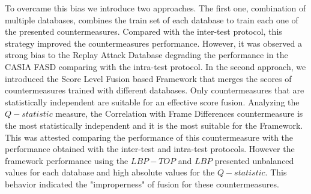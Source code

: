 To overcame this bias we introduce two approaches. The first one, combination of multiple databases, combines the train set of each database to train each one of the presented countermeasures. Compared with the inter-test protocol, this strategy improved the countermeasures performance. However, it was observed a strong bias to the Replay Attack Database degrading the performance in the CASIA FASD comparing with the intra-test protocol. In the second approach, we introduced the Score Level Fusion based Framework that merges the scores of countermeasures trained with different databases. Only countermeasures that are statistically independent are suitable for an effective score fusion. Analyzing the $Q-statistic$ measure, the Correlation with Frame Differences countermeasure is the most statistically independent and it is the most suitable for the Framework. This was attested comparing the performance of this countermeasure with the performance obtained with the inter-test and intra-test protocols.  However the framework performance using the $LBP-TOP$ and $LBP$ presented unbalanced values for each database and high absolute values for the $Q-statistic$. This behavior indicated the "improperness" of fusion for these countermeasures.

